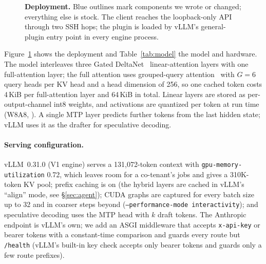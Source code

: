 \documentclass[acmtog,nonacm,screen]{acmart}
\begin{document}
\begin{figure}[t]
{}
\caption{\textbf{Deployment.} Blue outlines mark components we wrote or changed; everything else is stock. The client
reaches the loopback-only API through two SSH hops; the plugin is loaded by vLLM's general-plugin entry point in every
engine process.}
\label{fig:arch}
\end{figure}

Figure~\ref{fig:arch} shows the deployment and Table~\ref{tab:model} the model and hardware. The model interleaves
three Gated DeltaNet~\cite{yang2025gateddeltanet} linear-attention layers with one full-attention layer; the full
attention uses grouped-query attention~\cite{ainslie2023gqa} with $G{=}6$ query heads per KV head and a head
dimension of 256, so one cached token costs 4\,KiB per full-attention layer and 64\,KiB in total. Linear layers are
stored as per-output-channel int8 weights, and activations are quantized per token at run time (W8A8,
\cite{dettmers2022llmint8,xiao2023smoothquant}). A single MTP layer predicts further tokens from the last hidden
state; vLLM uses it as the drafter for speculative decoding.

\paragraph{Serving configuration.} vLLM~0.31.0 (V1 engine) serves a 131{,}072-token context with
\texttt{gpu-memory-utilization} 0.72, which leaves room for a co-tenant's jobs and gives a 310K-token KV pool; prefix
caching is on (the hybrid layers are cached in vLLM's ``align'' mode, see \S\ref{sec:agent}); CUDA graphs are captured
for every batch size up to 32 and in coarser steps beyond (\texttt{--performance-mode interactivity}); and speculative decoding uses the MTP head
with $k$ draft tokens. The Anthropic endpoint is vLLM's own; we add an ASGI middleware that accepts
\texttt{x-api-key} or bearer tokens with a constant-time comparison and guards every route but \texttt{/health}
(vLLM's built-in key check accepts only bearer tokens and guards only a few route prefixes).
\end{document}
